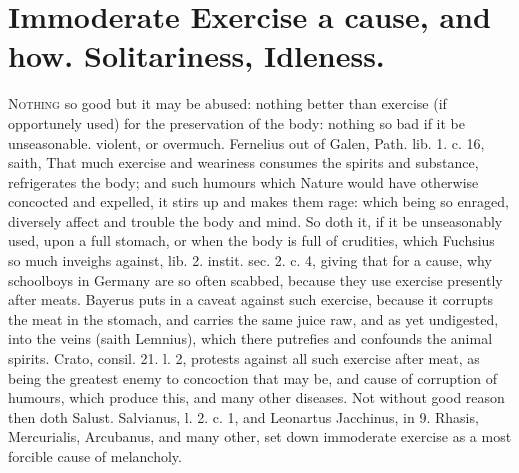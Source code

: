 {{%
\section[Immoderate Exercise, Idleness]{Immoderate Exercise a cause, and how. Solitariness, Idleness.}

\lettrine{N}{othing} so good but it may be abused: nothing better than exercise (if
opportunely used) for the preservation of the body: nothing so bad if
it be unseasonable. violent, or overmuch. Fernelius out of Galen, Path.
lib. 1. c. 16, saith, That much exercise and weariness consumes
the spirits and substance, refrigerates the body; and such humours
which Nature would have otherwise concocted and expelled, it stirs up
and makes them rage: which being so enraged, diversely affect and
trouble the body and mind. So doth it, if it be unseasonably used, upon
a full stomach, or when the body is full of crudities, which Fuchsius
so much inveighs against, lib. 2. instit. sec. 2. c. 4, giving that for
a cause, why schoolboys in Germany are so often scabbed, because they
use exercise presently after meats. Bayerus puts in a caveat
against such exercise, because it corrupts the meat in the
stomach, and carries the same juice raw, and as yet undigested, into
the veins (saith Lemnius), which there putrefies and confounds the
animal spirits. Crato, consil. 21. l. 2, protests against all
such exercise after meat, as being the greatest enemy to concoction
that may be, and cause of corruption of humours, which produce this,
and many other diseases. Not without good reason then doth Salust.
Salvianus, l. 2. c. 1, and Leonartus Jacchinus, in 9. Rhasis,
Mercurialis, Arcubanus, and many other, set down immoderate
exercise as a most forcible cause of melancholy.

}}
